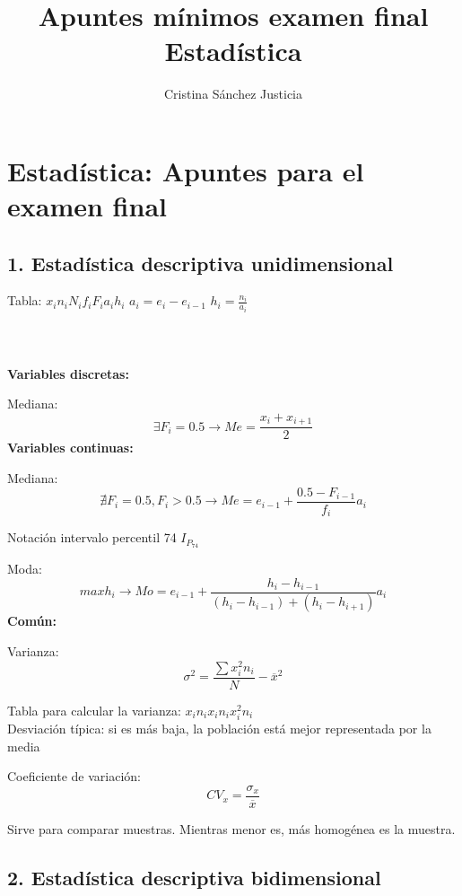 \documentclass[12pt,a4paper]{report}
\author{Cristina Sánchez Justicia }
\title{Apuntes mínimos examen final Estadística}
\begin{document}
\section*{Estadística: Apuntes para el examen final}
\subsection*{1. Estadística descriptiva unidimensional}

Tabla: $x_i  n_i  N_i  f_i  F_i  a_i  h_i$
\newline
$a_i = e_i - e_{i-1}$
\newline
$h_i = \frac{n_i}{a_i}$
\\\\
\\
\\
\textbf{Variables discretas: }

Mediana: \[ \exists F_i = 0.5 \longrightarrow Me = \frac { x_i + x_{i+1}}{2} \]
\newline
\newline
\newline
\textbf{Variables continuas: }

Mediana: \[ \nexists F_i = 0.5 , F_i > 0.5 \longrightarrow Me = e_{i-1} + \frac {0.5 - F_{i-1}}{f_i} a_i \]

Notación intervalo percentil 74 $ I_{P_{74}}$

Moda: \[ max h_i \longrightarrow Mo = e_{i-1} + \frac {h_i - h_{i-1}}{ (h_i - h_{i-1}) + (h_i - h_{i+1}) } a_i\]
\newline
\newline
\newline
\textbf{Común: }

Varianza:  \[ \sigma ^ 2 = \frac {\sum x_i ^ 2 n_i}{N} - \overline{x}^2 \]

Tabla para calcular la varianza: $ x_i n_i x_in_i x^2_in_i $\\


Desviación típica: si es más baja, la población está mejor
representada por la media
\newline

Coeficiente de variación: \[ CV_x = \frac {\sigma _ x} {\overline x} \]

Sirve para comparar muestras. Mientras menor es, más homogénea es la muestra.
\newpage

             \subsection*{2. Estadística descriptiva bidimensional }
\end{document}
